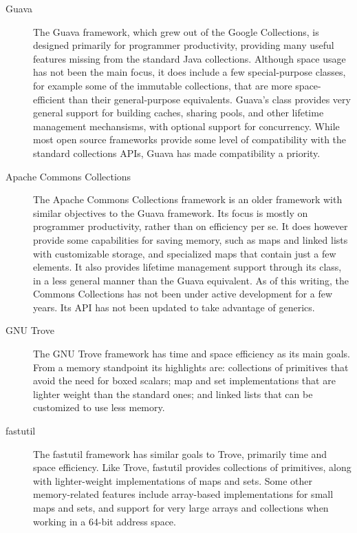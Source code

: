 \begin{description}

\item[Guava] The Guava framework, which grew out of the Google Collections,
is designed primarily for programmer productivity, providing many useful
features missing from the standard Java collections. 
Although space usage has not been the main focus, it does include a
few special-purpose classes, for example some of the immutable collections, that
are more space-efficient than their general-purpose equivalents. Guava's 
class provides very general support for 
building caches, sharing pools, and other lifetime management mechansisms,
with optional support for concurrency. While most open source frameworks provide some level of compatibility with the
standard collections APIs, Guava has made compatibility a priority.

\item[Apache Commons Collections] The Apache Commons Collections framework
is an older framework with similar objectives to the Guava framework.
Its focus is mostly on programmer productivity, rather than on efficiency per
se.
It does however provide some capabilities for saving memory, such as
maps and linked lists with customizable storage, and specialized 
maps that contain just a few elements. It also provides lifetime management
support through its  class, in a less general
manner than the Guava equivalent. As of this writing, the Commons Collections 
has not been under active development for a few years. Its API has
not been updated to take advantage of generics.

\item[GNU Trove] The GNU Trove framework has time and space efficiency as
its main goals.
From a memory standpoint its highlights are: collections of primitives that
avoid the need for boxed scalars;  map
and set implementations that are lighter weight than the standard ones; and
linked lists that can be customized to use less memory.

\item[fastutil] The fastutil framework has similar goals to Trove,
primarily time and space efficiency. Like Trove, fastutil provides collections
of primitives, along with lighter-weight implementations of maps and sets. Some
other memory-related features include array-based implementations for small
maps and sets, and support for very large arrays and collections when working
in a 64-bit address space.

\end{description}

